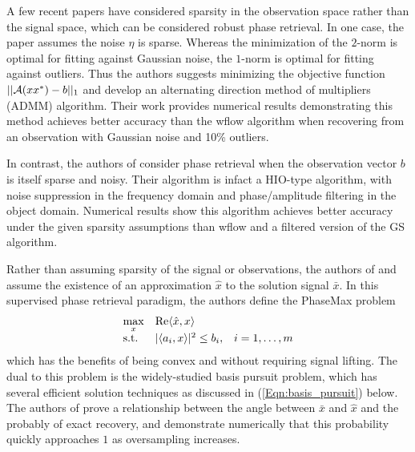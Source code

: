 A few recent papers have considered sparsity in the observation space rather than the signal space, which can be considered robust phase retrieval.  In one case, the paper \cite{jiang2017robust} assumes the noise $\eta$ is sparse.  Whereas the minimization of the $2$-norm is optimal for fitting against Gaussian noise, the $1$-norm is optimal for fitting against outliers.  Thus the authors suggests minimizing the objective function $||{\mathcal A}(xx^*) - b||_1$ and develop an alternating direction method of multipliers (ADMM) algorithm.  Their work provides numerical results demonstrating this method achieves better accuracy than the wflow algorithm when recovering from an observation with Gaussian noise and 10\% outliers.

In contrast, the authors of \cite{katkovnik2017phase} consider phase retrieval when the observation vector $b$ is itself sparse and noisy.  Their algorithm is infact a HIO-type algorithm, with noise suppression in the frequency domain and phase/amplitude filtering in the object domain.  Numerical results show this algorithm achieves better accuracy under the given sparsity assumptions than wflow and a filtered version of the GS algorithm.





Rather than assuming sparsity of the signal or observations, the authors of \cite{goldstein2018phasemax} and \cite{bahmani2016phase} assume the existence of an approximation $\hat{x}$ to the solution signal $\bar{x}$.  In this supervised phase retrieval paradigm, the authors define the PhaseMax problem
\begin{equation}
\begin{array}{lll}
	\max\limits_x	&	\mathrm{Re} \langle \hat{x}, x \rangle 		\\
	\textnormal{s.t.} 			&	| \langle a_i, x \rangle |^2 \leq b_i, 	&	i = 1, \ldots, m
\end{array}
\end{equation}
which has the benefits of being convex and without requiring signal lifting.  The dual to this problem is the widely-studied basis pursuit problem, which has several efficient solution techniques as discussed in (\ref{Eqn:basis_pursuit}) below.  The authors of \cite{goldstein2018phasemax} prove a relationship between the angle between $\bar{x}$ and $\hat{x}$ and the probably of exact recovery, and demonstrate numerically that this probability quickly approaches $1$ as oversampling increases.





